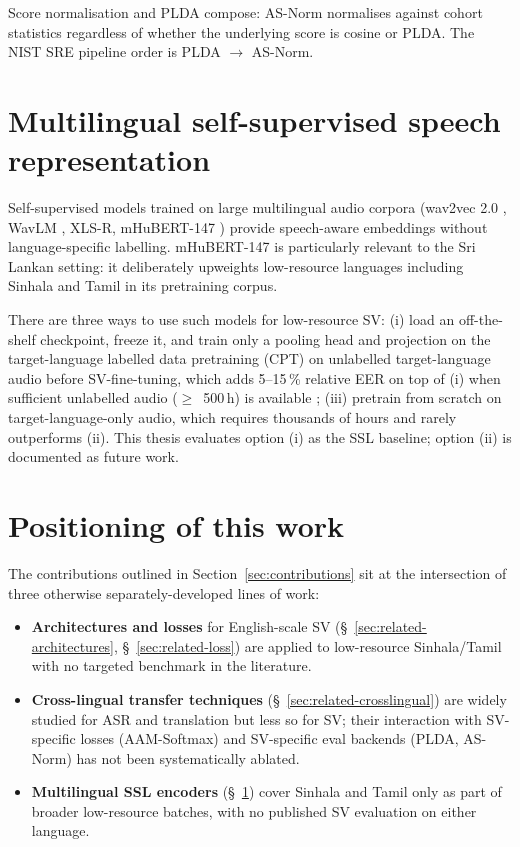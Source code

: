 Score normalisation and PLDA compose: AS-Norm normalises against
cohort statistics regardless of whether the underlying score is
cosine or PLDA. The NIST SRE pipeline order is PLDA $\to$ AS-Norm.


\section{Multilingual self-supervised speech representation}
\label{sec:related-ssl}

Self-supervised models trained on large multilingual audio corpora
(wav2vec 2.0 \cite{baevski2020wav2vec2}, WavLM
\cite{chen2022wavlm}, XLS-R, mHuBERT-147 \cite{boito2024mhubert})
provide speech-aware embeddings without language-specific labelling.
mHuBERT-147 is particularly relevant to the Sri Lankan setting: it
deliberately upweights low-resource languages including Sinhala and
Tamil in its pretraining corpus.

There are three ways to use such models for low-resource SV:
(i) load an off-the-shelf checkpoint, freeze it, and train only a
pooling head and projection on the target-language labelled data
pretraining (CPT) on unlabelled target-language audio before
SV-fine-tuning, which adds 5--15\,\% relative EER on top of (i)
when sufficient unlabelled audio ($\geq$~500\,h) is available
\cite{pratap2024mms}; (iii) pretrain from scratch on
target-language-only audio, which requires thousands of hours and
rarely outperforms (ii). This thesis evaluates option (i) as the
SSL baseline; option (ii) is documented as future work.

\section{Positioning of this work}
\label{sec:positioning}

The contributions outlined in
Section~\ref{sec:contributions} sit at the intersection of three
otherwise separately-developed lines of work:

\begin{itemize}
    \item \textbf{Architectures and losses} for English-scale SV
    (\S~\ref{sec:related-architectures}, \S~\ref{sec:related-loss})
    are applied to low-resource Sinhala/Tamil with no targeted
    benchmark in the literature.
    \item \textbf{Cross-lingual transfer techniques}
    (\S~\ref{sec:related-crosslingual}) are widely studied for ASR
    and translation but less so for SV; their interaction with
    SV-specific losses (AAM-Softmax) and SV-specific eval backends
    (PLDA, AS-Norm) has not been systematically ablated.
    \item \textbf{Multilingual SSL encoders}
    (\S~\ref{sec:related-ssl}) cover Sinhala and Tamil only as part
    of broader low-resource batches, with no published SV evaluation
    on either language.
\end{itemize}

